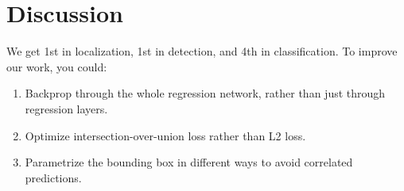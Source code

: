 \documentclass[a4paper]{article}
\begin{document}
\section{Discussion}
We get 1st in localization, 1st in detection, and 4th in classification. To
improve our work, you could:
\begin{enumerate}
  \item Backprop through the whole regression network, rather than just through
  regression layers.
  \item Optimize intersection-over-union loss rather than L2 loss.
  \item Parametrize the bounding box in different ways to avoid correlated
  predictions.
\end{enumerate}
\end{document}
